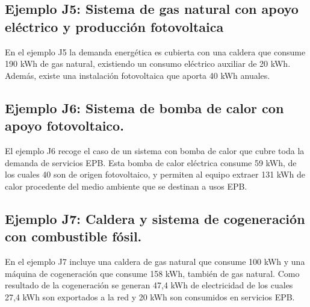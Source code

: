 \documentclass[10pt,notitlepage,oneside,a4paper]{article}
\begin{document}
\subsection{Ejemplo J5: Sistema de gas natural con apoyo eléctrico y producción fotovoltaica}
En el ejemplo J5 la demanda energética es cubierta con una caldera que consume 190 kWh de gas natural, existiendo un consumo eléctrico auxiliar de 20 kWh. Además, existe una instalación fotovoltaica que aporta 40 kWh anuales.





\subsection{Ejemplo J6: Sistema de bomba de calor con apoyo fotovoltaico.}
El ejemplo J6 recoge el caso de un sistema con bomba de calor que cubre toda la demanda de servicios EPB. Esta bomba de calor eléctrica consume 59 kWh, de los cuales 40 son de origen fotovoltaico, y permiten al equipo extraer 131 kWh de calor procedente del medio ambiente que se destinan a usos EPB.





\subsection{Ejemplo J7: Caldera y sistema de cogeneración con combustible fósil.}
En el ejemplo J7 incluye una caldera de gas natural que consume 100 kWh y una máquina de cogeneración que consume 158 kWh, también de gas natural. Como resultado de la cogeneración se generan 47,4 kWh de electricidad de los cuales 27,4 kWh son exportados a la red y 20 kWh son consumidos en servicios EPB.


\end{document}
